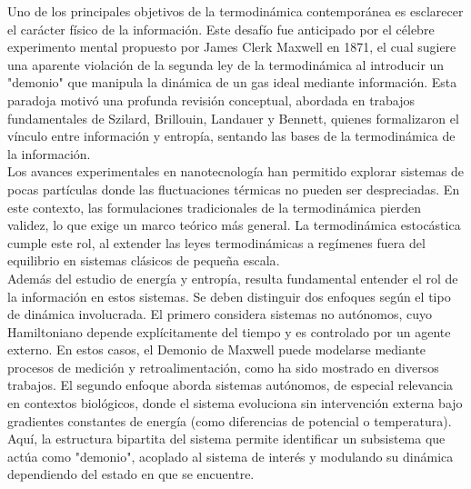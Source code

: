 %
%


Uno de los principales objetivos de la termodinámica contemporánea es esclarecer el carácter físico de la información. Este desafío fue anticipado por el célebre experimento mental propuesto por James Clerk Maxwell en 1871, el cual sugiere una aparente violación de la segunda ley de la termodinámica al introducir un "demonio" que manipula la dinámica de un gas ideal mediante información\cite{Maxwell_1871}. Esta paradoja motivó una profunda revisión conceptual, abordada en trabajos fundamentales de Szilard\cite{szilard1964decrease}, Brillouin\cite{brillouin1951maxwell}, Landauer\cite{Landauer_1961} y Bennett\cite{bennett1982thermodynamics}, quienes formalizaron el vínculo entre información y entropía, sentando las bases de la termodinámica de la información. \\

Los avances experimentales en nanotecnología han permitido explorar sistemas de pocas partículas donde las fluctuaciones térmicas no pueden ser despreciadas\cite{douarche2005experimental,wang2005experimental}. En este contexto, las formulaciones tradicionales de la termodinámica pierden validez, lo que exige un marco teórico más general. La termodinámica estocástica cumple este rol, al extender las leyes termodinámicas a regímenes fuera del equilibrio en sistemas clásicos de pequeña escala\cite{van2013stochastic,jarzynski1997nonequilibrium}. \\

Además del estudio de energía y entropía, resulta fundamental entender el rol de la información en estos sistemas. Se deben distinguir dos enfoques según el tipo de dinámica involucrada. El primero considera sistemas no autónomos, cuyo Hamiltoniano depende explícitamente del tiempo y es controlado por un agente externo. En estos casos, el Demonio de Maxwell puede modelarse mediante procesos de medición y retroalimentación, como ha sido mostrado en diversos trabajos\cite{cao2009thermodynamics,sagawa2010generalized}. El segundo enfoque aborda sistemas autónomos, de especial relevancia en contextos biológicos\cite{ehrich2023energy}, donde el sistema evoluciona sin intervención externa bajo gradientes constantes de energía (como diferencias de potencial o temperatura). Aquí, la estructura bipartita del sistema permite identificar un subsistema que actúa como "demonio", acoplado al sistema de interés y modulando su dinámica dependiendo del estado en que se encuentre. \\

